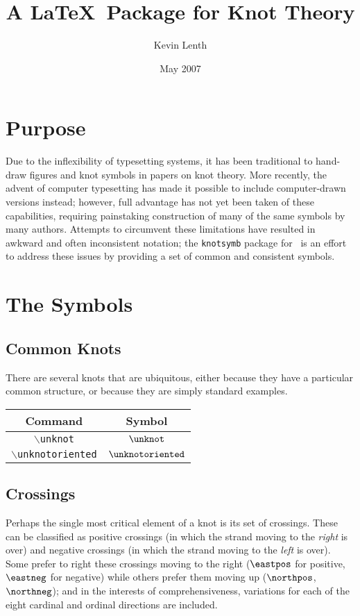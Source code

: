 \documentclass[12pt]{article}
\title{A \LaTeX\ Package for Knot Theory}
\author{Kevin Lenth}
\date{May 2007}
\newcommand{\cn}[1]{$\backslash$\texttt{#1}}
\begin{document}
\maketitle

\section{Purpose}
Due to the inflexibility of typesetting systems, it has been traditional to hand-draw figures and knot symbols in papers on knot theory.  More recently, the advent of computer typesetting has made it possible to include computer-drawn versions instead; however, full advantage has not yet been taken of these capabilities, requiring painstaking construction of many of the same symbols by many authors.  Attempts to circumvent these limitations have resulted in awkward and often inconsistent notation; the \texttt{knotsymb} package for \LaTeXe\ is an effort to address these issues by providing a set of common and consistent symbols.

\section{The Symbols}
\subsection{Common Knots}
There are several knots that are ubiquitous, either because they have a particular common structure, or because they are simply standard examples.

\begin{center}
\begin{tabular}{|cc|}
\hline
Command & Symbol \\
\hline\hline
\cn{unknot} & $\unknot$ \\
\cn{unknotoriented} & $\unknotoriented$ \\
\hline
\end{tabular}
\end{center}

\subsection{Crossings}
Perhaps the single most critical element of a knot is its set of crossings.  These can be classified as positive crossings (in which the strand moving to the \textsl{right} is over) and negative crossings (in which the strand moving to the \textsl{left} is over).  Some prefer to right these crossings moving to the right ($\eastpos$ for positive, $\eastneg$ for negative) while others prefer them moving up ($\northpos$, $\northneg$); and in the interests of comprehensiveness, variations for each of the eight cardinal and ordinal directions are included.
\end{document}

